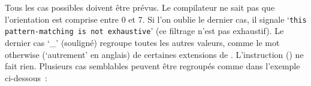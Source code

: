 {\begin{minipage}{\myparboxwidth}
{\vspace{\neglskip}\mbox{}\par
\vspace{\neglskip}\mbox{}\par
\vspace{\neglskip}\mbox{}\par
\vspace{\neglskip}\mbox{}\par
\vspace{\neglskip}\mbox{}\par
\vspace{\neglskip}\mbox{}\par
\vspace{\neglskip}\mbox{}\par
\vspace{\neglskip}\mbox{}\par
\vspace{\neglskip}\mbox{}\par
\vspace{\neglskip}\mbox{}\par

\medskip }


\noindent Tous les cas possibles doivent être prévus. Le compilateur ne sait pas que l'orientation
est comprise entre 0 et 7. Si l'on oublie le dernier cas, il signale
`{\tt this pattern-matching is not exhaustive}' (ce filtrage n'est pas exhaustif).
Le dernier cas `{\idt \_}' (souligné) regroupe toutes les autres valeurs, comme le mot
{\mcl otherwise} (`autrement' en anglais) de certaines extensions de \pascal. 
L'instruction {\idt ()} ne fait rien. Plusieurs cas semblables peuvent être regroupés 
comme dans l'exemple ci-dessous~:


\end{minipage}}
